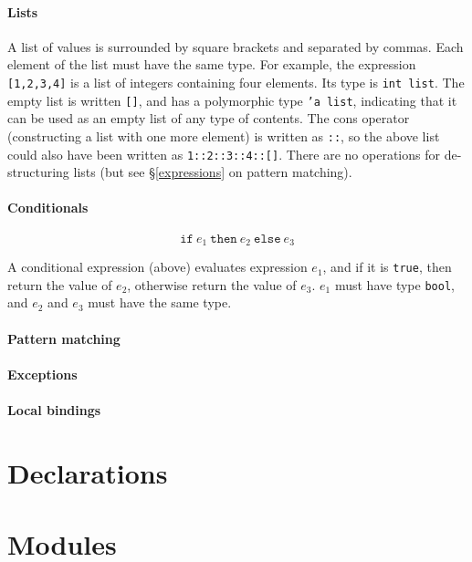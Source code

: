 \documentclass[12pt,a4paper]{book}
\begin{document}
\paragraph{Lists} A list of values is surrounded by square brackets and separated by commas. Each element of the list must have the same type. For example, the expression \texttt{[1,2,3,4]} is a list of integers containing four elements. Its type is \texttt{int list}. The empty list is written \texttt{[]}, and has a polymorphic type \texttt{'a list}, indicating that it can be used as an empty list of any type of contents. The cons operator (constructing a list with one more element) is written as \texttt{::}, so the above list could also have been written as \texttt{1::2::3::4::[]}. There are no operations for de-structuring lists (but see \S\ref{expressions} on pattern matching).

\paragraph{Conditionals}
%
\[\texttt{if}\ e_1\ \texttt{then}\ e_2\ \texttt{else}\ e_3\]

A conditional expression (above) evaluates expression $e_1$, and if it is \texttt{true}, then return the value of $e_2$, otherwise return the value of $e_3$. $e_1$ must have type \texttt{bool}, and $e_2$ and $e_3$ must have the same type.

\paragraph{Pattern matching}

\paragraph{Exceptions}

\paragraph{Local bindings}

\section{Declarations}
\label{declarations}

\section{Modules}
\end{document}
